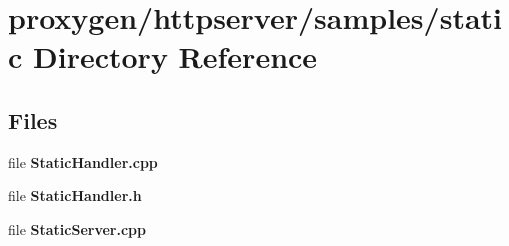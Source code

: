 \section{proxygen/httpserver/samples/static Directory Reference}
\label{dir_bd43e42c26c52bbc7a05a5a6d585cec8}
\subsection*{Files}
\begin{DoxyCompactItemize}
\item 
file {\bf Static\+Handler.\+cpp}
\item 
file {\bf Static\+Handler.\+h}
\item 
file {\bf Static\+Server.\+cpp}
\end{DoxyCompactItemize}
